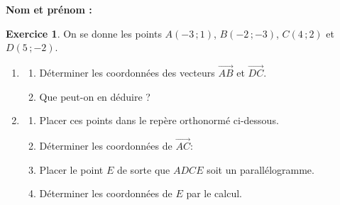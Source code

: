 \documentclass{article}
\theoremstyle{definition}
\newtheorem{exercice}{Exercice}
\begin{document}
\pagestyle{fancy}

\fancyhf{} %
\fancyhead[L]{\large \textbf{\Niveau}}
\fancyhead[C]{\large \textbf{\ChapitreCourt}}

\large

\textbf{Nom et prénom :}\enspace\dotfill

\begin{exercice}
  On se donne les points $A(-3\,; 1)$, $B(-2\,; -3)$, $C(4\,; 2)$ et $D(5\,; -2)$.

  \begin{enumerate}
    \item
      \begin{enumerate}
        \item Déterminer les coordonnées des vecteurs $\overrightarrow{AB}$ et $\overrightarrow{DC}$.
        \item Que peut-on en déduire ?
      \end{enumerate}
    \begin{center}
    \end{center}
    \item
      \begin{enumerate}
        \item Placer ces points dans le repère orthonormé ci-dessous.
        \item Déterminer les coordonnées de $\overrightarrow{AC}$:
        \begin{center}
          \end{center}
        \item Placer le point $E$ de sorte que $ADCE$ soit un parallélogramme.
        \item Déterminer les coordonnées de $E$ par le calcul.
        \begin{center}
        \end{center}
      \end{enumerate}
  \end{enumerate}
  \begin{center}

\end{center}
\end{exercice}
\end{document}
